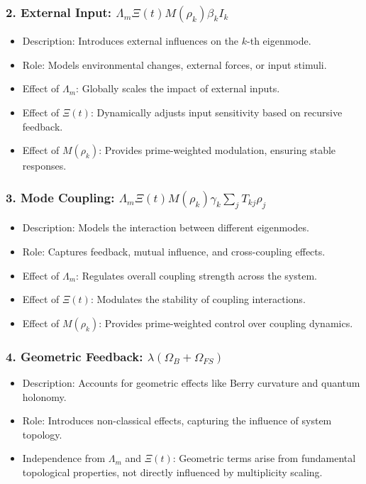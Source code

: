\documentclass[12pt]{article}
\theoremstyle{plain}
\begin{document}
\subsubsection{2. External Input: \( \Lambda_m \Xi(t) M(\rho_k) \beta_k I_k \)}
\begin{itemize}
    \item Description: Introduces external influences on the \( k \)-th eigenmode.
    \item Role: Models environmental changes, external forces, or input stimuli.
    \item Effect of \(\Lambda_m\): Globally scales the impact of external inputs.
    \item Effect of \(\Xi(t)\): Dynamically adjusts input sensitivity based on recursive feedback.
    \item Effect of \(M(\rho_k)\): Provides prime-weighted modulation, ensuring stable responses.
\end{itemize}

\subsubsection{3. Mode Coupling: \( \Lambda_m \Xi(t) M(\rho_k) \gamma_k \sum_j T_{kj} \rho_j \)}
\begin{itemize}
    \item Description: Models the interaction between different eigenmodes.
    \item Role: Captures feedback, mutual influence, and cross-coupling effects.
    \item Effect of \(\Lambda_m\): Regulates overall coupling strength across the system.
    \item Effect of \(\Xi(t)\): Modulates the stability of coupling interactions.
    \item Effect of \(M(\rho_k)\): Provides prime-weighted control over coupling dynamics.
\end{itemize}

\subsubsection{4. Geometric Feedback: \( \lambda (\Omega_B + \Omega_{FS}) \)}
\begin{itemize}
    \item Description: Accounts for geometric effects like Berry curvature and quantum holonomy.
    \item Role: Introduces non-classical effects, capturing the influence of system topology.
    \item Independence from \(\Lambda_m\) and \(\Xi(t)\): Geometric terms arise from fundamental topological properties, not directly influenced by multiplicity scaling.
\end{itemize}
\end{document}
